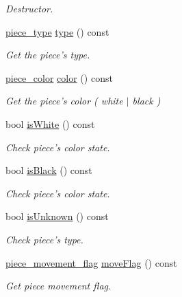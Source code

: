 \begin{DoxyCompactItemize}
\begin{DoxyCompactList}\small\item\em Destructor. \item\end{DoxyCompactList}\item 
\hyperlink{namespaceChEngn_a2a35c185f259757a78e937575b8ed483}{piece\_\-type} \hyperlink{classChEngn_1_1Piece_ada7e6cf6a90f169f2ea1a5d7cefd0900}{type} () const 
\begin{DoxyCompactList}\small\item\em Get the piece's type. \item\end{DoxyCompactList}\item 
\hyperlink{namespaceChEngn_a9c81426c0134a97288a226c122daf62f}{piece\_\-color} \hyperlink{classChEngn_1_1Piece_a9070b15958ab83d1a093456fa8d1e4fd}{color} () const 
\begin{DoxyCompactList}\small\item\em Get the piece's color ( white $|$ black ) \item\end{DoxyCompactList}\item 
bool \hyperlink{classChEngn_1_1Piece_a98920893afeab5395dba002ab3f88703}{isWhite} () const 
\begin{DoxyCompactList}\small\item\em Check piece's color state. \item\end{DoxyCompactList}\item 
bool \hyperlink{classChEngn_1_1Piece_a481b3d61628762f87d674fad3f858c3b}{isBlack} () const 
\begin{DoxyCompactList}\small\item\em Check piece's color state. \item\end{DoxyCompactList}\item 
bool \hyperlink{classChEngn_1_1Piece_a4105456968fa768a8d3673ce3c14eca3}{isUnknown} () const 
\begin{DoxyCompactList}\small\item\em Check piece's type. \item\end{DoxyCompactList}\item 
\hyperlink{namespaceChEngn_a491b2eba2f766087f4f28948005ab16a}{piece\_\-movement\_\-flag} \hyperlink{classChEngn_1_1Piece_a534f3e26cfbff6dde35a4dea75f115b9}{moveFlag} () const 
\begin{DoxyCompactList}\small\item\em Get piece movement flag. \item\end{DoxyCompactList}\item 

\end{DoxyCompactItemize}
